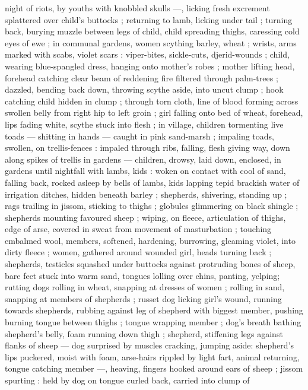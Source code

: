 \documentclass[10pt,twoside]{memoir}
\begin{document}
night of riots, by youths with knobbled skulls ---, licking fresh 
excrement splattered over child's buttocks ; returning to lamb, licking 
under tail ; turning back, burying muzzle between legs of child, child 
spreading thighs, caressing cold eyes of ewe ; in communal gardens, 
women scything barley, wheat ; wrists, arms marked with scabs, violet 
scars : viper-bites, sickle-cuts, djerid-wounds ; child, wearing 
blue-spangled dress, hanging onto mother's robes ; mother lifting head, 
forehead catching clear beam of reddening fire filtered through 
palm-trees ; dazzled, bending back down, throwing scythe aside, into 
uncut clump ; hook catching child hidden in clump ; through torn 
cloth, line of blood forming across swollen belly from right hip to left 
groin ; girl falling onto bed of wheat, forehead, lips fading white, 
scythe stuck into flesh ; in village, children tormenting live toads --- 
shitting in hands --- caught in pink sand-marsh ; impaling toads, 
swollen, on trellis-fences : impaled through ribs, falling, flesh giving 
way, down along spikes of trellis in gardens --- children, drowsy, laid 
down, enclosed, in gardens until nightfall with lambs, kids : woken on 
contact with cool of sand, falling back, rocked asleep by bells of 
lambs, kids lapping tepid brackish water of irrigation ditches, hidden 
beneath barley ; shepherds, shivering, standing up ; rags trailing in 
jissom, sticking to thighs ; globules glimmering on black shingle ; 
shepherds mounting favoured sheep ; wiping, on fleece, articulation 
of thighs, edge of arse, covered in sweat from movement of 
masturbation ; touching embalmed wool, members, softened, 
hardening, burrowing, gleaming violet, into dirty fleece ; women, 
gathered around wounded girl, heads turning back ; shepherds, 
testicles squashed under buttocks against protruding bones of 
sheep, bare feet stuck into warm sand, tongues lolling over chins, 
panting, yelping; rutting dogs rolling in wheat, snapping at dresses 
of women ; rolling in sand, snapping at members of shepherds ; 
russet dog licking girl's wound, running towards shepherds, rubbing 
against leg of shepherd with biggest member, pushing burning %
tongue between thighs ; tongue wrapping member ; dog's breath 
bathing shepherd's belly, foam running down thigh ; shepherd, 
stiffening legs against flanks of sheep --- dog surprised by muscles 
cracking, jumping aside: shepherd's lips puckered, moist with foam, 
arse-hairs rippled by light fart, animal returning, tongue catching 
member ---, heaving, fingers hooked around ears of sheep ; jissom 
spurting : held by dog on tongue curled back, carried into clump of 
\end{document}
